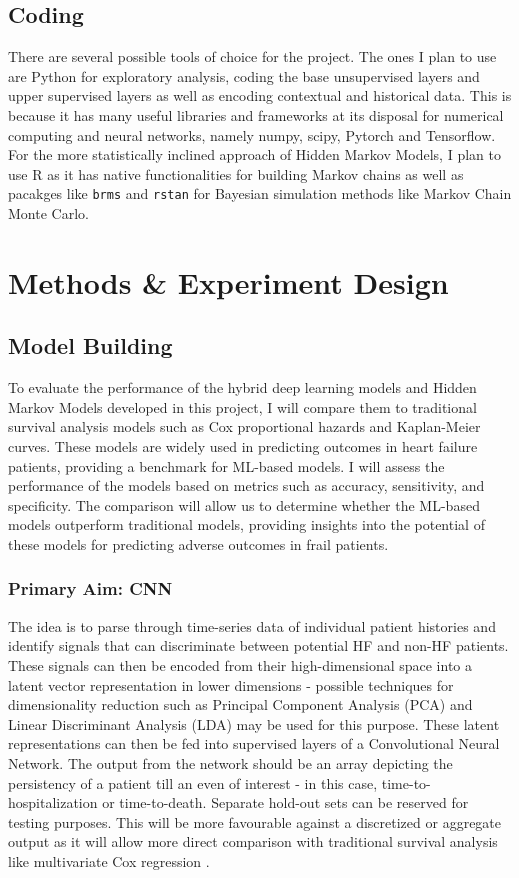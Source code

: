 \documentclass[%
 reprint,
 amsmath,amssymb,
 aps,
 nofootinbib,
]{revtex4-2}
\theoremstyle{definition}
\begin{document}
\subsection{\label{coding}Coding}

There are several possible tools of choice for the project. The ones I plan to use are Python for exploratory analysis, coding the base unsupervised layers and upper supervised layers as well as encoding contextual and historical data. This is because it has many useful libraries and frameworks at its disposal for numerical computing and neural networks, namely numpy, scipy, Pytorch and Tensorflow. For the more statistically inclined approach of Hidden Markov Models, I plan to use R as it has native functionalities for building Markov chains as well as pacakges like \texttt{brms} and \texttt{rstan} for Bayesian simulation methods like Markov Chain Monte Carlo.

\section{\label{methods}Methods \& Experiment Design}

\subsection{\label{build}Model Building}
To evaluate the performance of the hybrid deep learning models and Hidden Markov Models developed in this project, I will compare them to traditional survival analysis models such as Cox proportional hazards and Kaplan-Meier curves. These models are widely used in predicting outcomes in heart failure patients, providing a benchmark for ML-based models. I will assess the performance of the models based on metrics such as accuracy, sensitivity, and specificity. The comparison will allow us to determine whether the ML-based models outperform traditional models, providing insights into the potential of these models for predicting adverse outcomes in frail patients.
\subsubsection{\label{prim}Primary Aim: CNN}
The idea is to parse through time-series data of individual patient histories and identify signals that can discriminate between potential HF and non-HF patients. These signals can then be encoded from their high-dimensional space into a latent vector representation in lower dimensions - possible techniques for dimensionality reduction such as Principal Component Analysis (PCA) and Linear Discriminant Analysis (LDA) may be used for this purpose. These latent representations can then be fed into supervised layers of a Convolutional Neural Network. The output from the network should be an array depicting the persistency of a patient till an even of interest - in this case, time-to-hospitalization or time-to-death. Separate hold-out sets can be reserved for testing purposes. This will be more favourable against a discretized or aggregate output as it will allow more direct comparison with traditional survival analysis like multivariate Cox regression \citep{lin1994cox}.
\end{document}
